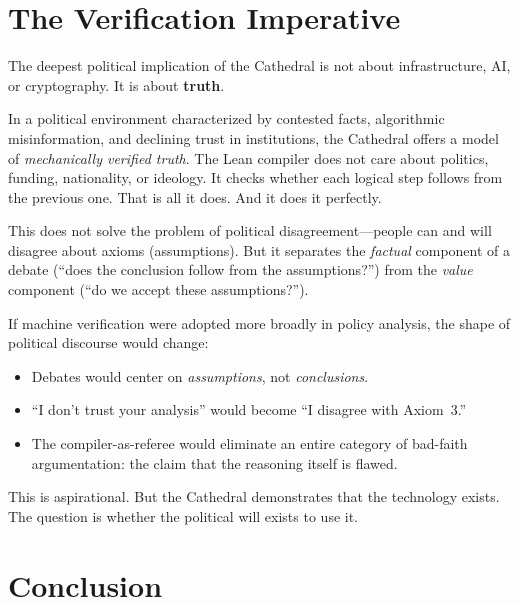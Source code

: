 \documentclass[11pt,a4paper]{article}
\begin{document}
\section{The Verification Imperative}
\label{sec:imperative}

The deepest political implication of the Cathedral is not about
infrastructure, AI, or cryptography. It is about \textbf{truth}.

In a political environment characterized by contested facts,
algorithmic misinformation, and declining trust in institutions,
the Cathedral offers a model of \emph{mechanically verified truth}.
The Lean compiler does not care about politics, funding,
nationality, or ideology. It checks whether each logical step
follows from the previous one. That is all it does. And it does
it perfectly.

This does not solve the problem of political disagreement---people
can and will disagree about axioms (assumptions). But it separates
the \emph{factual} component of a debate (``does the conclusion
follow from the assumptions?'') from the \emph{value} component
(``do we accept these assumptions?'').

If machine verification were adopted more broadly in policy
analysis, the shape of political discourse would change:

\begin{itemize}
  \item Debates would center on \emph{assumptions}, not
    \emph{conclusions}.
  \item ``I don't trust your analysis'' would become
    ``I disagree with Axiom~3.''
  \item The compiler-as-referee would eliminate an entire category
    of bad-faith argumentation: the claim that the reasoning itself
    is flawed.
\end{itemize}

This is aspirational. But the Cathedral demonstrates that the
technology exists. The question is whether the political will
exists to use it.

\section{Conclusion}
\end{document}
